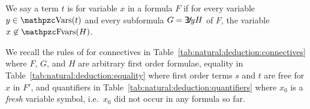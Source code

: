 




\begin{definition}
	We say a term \( t \) is  for variable \( x \)
	in a formula \( F \) if for every variable \( y \in \var(t) \)
	and every subformula \( G = \quantify y H \) of \( F \),
	the variable \( x \not\in\fvar(H) \).
\end{definition}




\begin{definition}\label{def:natural:deduction}
	We recall the rules of  for connectives
	in Table~\ref{tab:natural:deduction:connectives}
	where \( F \), \( G \), and \( H \) are arbitrary first order formulae,
	equality in Table~\ref{tab:natural:deduction:equality}
	where first order terms \( s \) and \( t \) are free for \( x \) in \( F' \),
	and quantifiers in
	Table~\ref{tab:natural:deduction:quantifiers}
	where \( x_0 \) is a \emph{fresh} variable symbol,
	i.e.~\( x_0 \) did not occur in any formula so far.
\end{definition}




